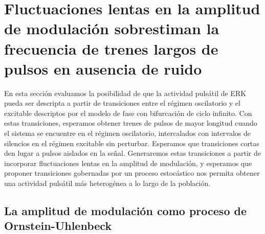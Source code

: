 \documentclass[./main.tex]{subfiles}
\begin{document}
\section{Fluctuaciones lentas en la amplitud de modulación sobrestiman la frecuencia de trenes largos de pulsos en ausencia de ruido}
\label{C7_sec:OU}

En esta sección evaluamos la posibilidad de que la actividad pulsátil de ERK pueda ser descripta a partir de transiciones entre el régimen oscilatorio y el excitable descriptos por el modelo de fase con bifurcación de ciclo infinito. Con estas transiciones, esperamos obtener trenes de pulsos de mayor longitud cuando el sistema se encuentre en el régimen oscilatorio, intercalados con intervalos de silencios en el régimen excitable sin perturbar. Esperamos que transiciones cortas den lugar a pulsos aislados en la señal. Generaremos estas transiciones a partir de incorporar fluctuaciones lentas en la amplitud de modulación, y esperamos que proponer transiciones gobernadas por un proceso estocástico nos permita obtener una actividad pulsátil más heterogénea a lo largo de la población. 


\subsection{La amplitud de modulación como proceso de Ornstein-Uhlenbeck}
\end{document}
